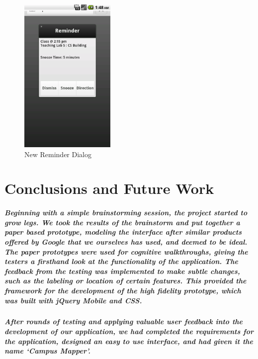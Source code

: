 \documentclass{report}
\begin{document}
    \begin{figure}
    \centering
        \includegraphics[height=3in]{img/post-dialog.png}
    \caption{New Reminder Dialog}
    \label{fig:heuristic-dialog}
    \end{figure}
\chapter{Conclusions and Future Work}
    \paragraph{Beginning with a simple brainstorming session, the project started to
    grow legs. We took the results of the brainstorm and put together a paper based
    prototype, modeling the interface after similar products offered by Google that
    we ourselves has used, and deemed to be ideal. The paper prototypes were used
    for cognitive walkthroughs, giving the testers a firsthand look at the
    functionality of the application. The feedback from the testing was implemented
    to make subtle changes, such as the labeling or location of certain features.
    This provided the framework for the development of the high fidelity prototype,
    which was built with jQuery Mobile and CSS.}
    \paragraph{After rounds of testing and applying valuable user feedback into the
    development of our application, we had completed the requirements for the
    application, designed an easy to use interface, and had given it the name
    ‘Campus Mapper’.}
\end{document}
